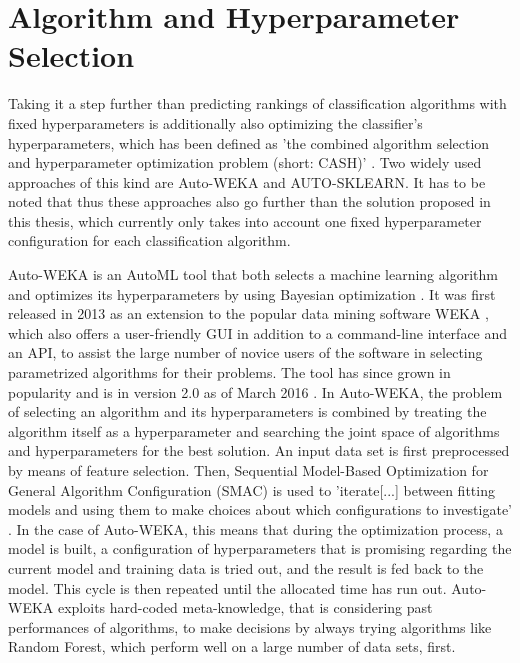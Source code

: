 \section{Algorithm and Hyperparameter Selection}
Taking it a step further than predicting rankings of classification algorithms with fixed hyperparameters is additionally also optimizing the classifier's hyperparameters, which has been defined as 'the combined algorithm selection and hyperparameter optimization problem (short: CASH)' \cite{thornton2013auto}. Two widely used approaches of this kind are Auto-WEKA and AUTO-SKLEARN. It has to be noted that thus these approaches also go further than the solution proposed in this thesis, which currently only takes into account one fixed hyperparameter configuration for each classification algorithm. 

Auto-WEKA is an AutoML tool that both selects a machine learning algorithm and optimizes its hyperparameters by using Bayesian optimization \cite{thornton2013auto}. It was first released in 2013 as an extension to the popular data mining software WEKA \cite{hall2009weka}, which also offers a user-friendly GUI in addition to a command-line interface and an API, to assist the large number of novice users of the software in selecting parametrized algorithms for their problems. The tool has since grown in popularity and is in version 2.0 as of March 2016 \cite{kotthoff2016auto}. In Auto-WEKA, the problem of selecting an algorithm and its hyperparameters is combined by treating the algorithm itself as a hyperparameter and searching the joint space of algorithms and hyperparameters for the best solution. An input data set is first preprocessed by means of feature selection. Then, Sequential Model-Based Optimization for General Algorithm Configuration (SMAC) is used to 'iterate[...] between fitting models and using them to make choices about which configurations to investigate' \cite{hutter2011sequential}. In the case of Auto-WEKA, this means that during the optimization process, a model is built, a configuration of hyperparameters that is promising regarding the current model and training data is tried out, and the result is fed back to the model. This cycle is then repeated until the allocated time has run out. Auto-WEKA exploits hard-coded meta-knowledge, that is considering past performances of algorithms, to make decisions by always trying algorithms like Random Forest, which perform well on a large number of data sets, first. \\

